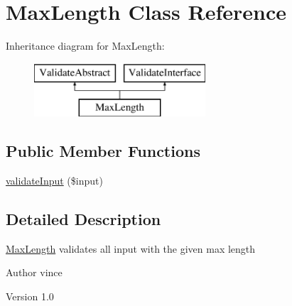 \hypertarget{class_anemo_1_1_validate_1_1_adapter_1_1_max_length}{
\section{MaxLength Class Reference}
\label{class_anemo_1_1_validate_1_1_adapter_1_1_max_length}
}
Inheritance diagram for MaxLength:\begin{figure}[H]
\begin{center}
\leavevmode
\includegraphics[height=2.000000cm]{class_anemo_1_1_validate_1_1_adapter_1_1_max_length}
\end{center}
\end{figure}
\subsection*{Public Member Functions}
\begin{DoxyCompactItemize}
\item 
\hyperlink{class_anemo_1_1_validate_1_1_adapter_1_1_max_length_aaa5a5ce40dbb70cc1caa4482c0b7aa33}{validateInput} (\$input)
\end{DoxyCompactItemize}


\subsection{Detailed Description}
\hyperlink{class_anemo_1_1_validate_1_1_adapter_1_1_max_length}{MaxLength} validates all input with the given max length \begin{DoxyAuthor}{Author}
vince 
\end{DoxyAuthor}
\begin{DoxyVersion}{Version}
1.0 
\end{DoxyVersion}


